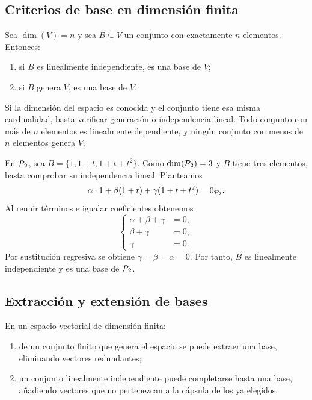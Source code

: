 \documentclass[compacto,10pt]{pubciencias-notas}
\begin{document}
\subsection{Criterios de base en dimensión finita}

\begin{teo}\label{sem10cl02:criterio}
    Sea $\dim(V)=n$ y sea $B\subseteq V$ un conjunto con exactamente
    $n$ elementos. Entonces:
    \begin{enumerate}
        \item si $B$ es linealmente independiente, es una base de $V$;
        \item si $B$ genera $V$, es una base de $V$.
    \end{enumerate}
\end{teo}

Si la dimensión del espacio es conocida y el conjunto tiene esa misma
cardinalidad, basta verificar generación o independencia lineal.
Todo conjunto con más de $n$ elementos es linealmente dependiente, y ningún conjunto con
menos de $n$ elementos genera $V$.

\begin{ejem}
    En $\mathcal{P}_2$, sea $B=\{1,1+t,1+t+t^2\}$. Como $\dim(\mathcal{P}_2)=3$
    y $B$ tiene tres elementos, basta comprobar su independencia lineal. Planteamos
    \[
        \alpha\cdot1+\beta(1+t)+\gamma(1+t+t^2)=0_{\mathcal{P}_2}.
    \]
    Al reunir términos e igualar coeficientes obtenemos
    \[
        \left\{\begin{aligned}
            \alpha+\beta+\gamma&=0,\\
            \beta+\gamma&=0,\\
            \gamma&=0.
        \end{aligned}\right.
    \]
    Por sustitución regresiva se obtiene $\gamma=\beta=\alpha=0$. Por tanto, $B$ es
    linealmente independiente y es una base de $\mathcal{P}_2$.
\end{ejem}

\subsection{Extracción y extensión de bases}

\begin{prop}
    En un espacio vectorial de dimensión finita:
    \begin{enumerate}
        \item de un conjunto finito que genera el espacio se puede
              extraer una base, eliminando vectores redundantes;
        \item un conjunto linealmente independiente puede completarse hasta una base, añadiendo
              vectores que no pertenezcan a la cápsula de los ya elegidos.
    \end{enumerate}
\end{prop}
\end{document}
